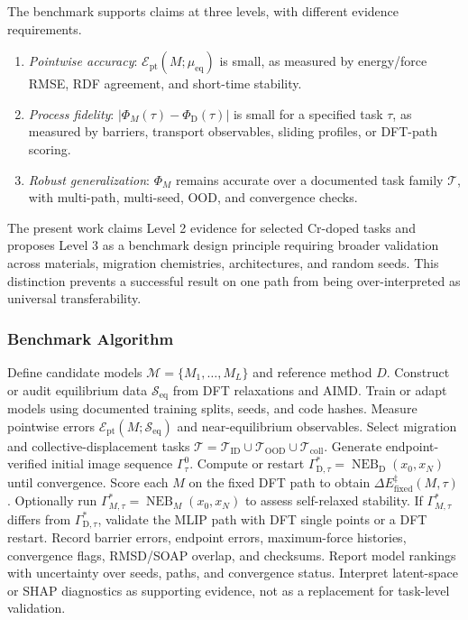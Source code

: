 The benchmark supports claims at three levels, with different evidence requirements.
\begin{enumerate}
    \item \textit{Pointwise accuracy}: $\mathcal E_{\mathrm{pt}}(M;\mu_{\mathrm{eq}})$ is small, as measured by energy/force RMSE, RDF agreement, and short-time stability.
    \item \textit{Process fidelity}: $|\Phi_M(\tau)-\Phi_{\mathrm D}(\tau)|$ is small for a specified task $\tau$, as measured by barriers, transport observables, sliding profiles, or DFT-path scoring.
    \item \textit{Robust generalization}: $\Phi_M$ remains accurate over a documented task family $\mathcal T$, with multi-path, multi-seed, OOD, and convergence checks.
\end{enumerate}
The present work claims Level 2 evidence for selected Cr-doped  tasks and proposes Level 3 as a benchmark design principle requiring broader validation across materials, migration chemistries, architectures, and random seeds. This distinction prevents a successful result on one path from being over-interpreted as universal transferability.

\subsubsection{Benchmark Algorithm}
\label{sec:benchmark_algorithm_formal}

\begin{algorithm}[H]
\caption{Migration-centered MLIP benchmark}
\label{alg:migration_benchmark}
\begin{algorithmic}[1]
\State Define candidate models $\mathcal M=\{M_1,\ldots,M_L\}$ and reference method $D$.
\State Construct or audit equilibrium data $\mathcal S_{\mathrm{eq}}$ from DFT relaxations and AIMD.
\State Train or adapt models using documented training splits, seeds, and code hashes.
\State Measure pointwise errors $\mathcal E_{\mathrm{pt}}(M;\mathcal S_{\mathrm{eq}})$ and near-equilibrium observables.
\State Select migration and collective-displacement tasks $\mathcal T=\mathcal T_{\mathrm{ID}}\cup\mathcal T_{\mathrm{OOD}}\cup\mathcal T_{\mathrm{coll}}$.
    \State Generate endpoint-verified initial image sequence $\Gamma_\tau^0$.
    \State Compute or restart $\Gamma_{\mathrm D,\tau}^{*}=\operatorname{NEB}_{\mathrm D}(x_0,x_N)$ until convergence.
    \State Score each $M$ on the fixed DFT path to obtain $\Delta E_{\mathrm{fixed}}^{\ddagger}(M,\tau)$.
    \State Optionally run $\Gamma_{M,\tau}^{*}=\operatorname{NEB}_{M}(x_0,x_N)$ to assess self-relaxed stability.
    \State If $\Gamma_{M,\tau}^{*}$ differs from $\Gamma_{\mathrm D,\tau}^{*}$, validate the MLIP path with DFT single points or a DFT restart.
    \State Record barrier errors, endpoint errors, maximum-force histories, convergence flags, RMSD/SOAP overlap, and checksums.
\EndFor
\State Report model rankings with uncertainty over seeds, paths, and convergence status.
\State Interpret latent-space or SHAP diagnostics as supporting evidence, not as a replacement for task-level validation.
\end{algorithmic}
\end{algorithm}


